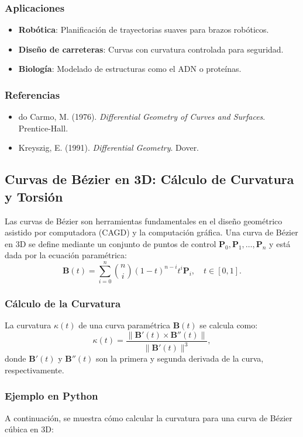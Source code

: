 \documentclass[11pt]{book}
\theoremstyle{definicion}
\theoremstyle{teorema}
\theoremstyle{ejemplo}
\begin{document}
\subsubsection{Aplicaciones}
\begin{itemize}
    \item \textbf{Robótica}: Planificación de trayectorias suaves para brazos robóticos.
    \item \textbf{Diseño de carreteras}: Curvas con curvatura controlada para seguridad.
    \item \textbf{Biología}: Modelado de estructuras como el ADN o proteínas.
\end{itemize}

\subsubsection{Referencias}
\begin{itemize}
    \item do Carmo, M. (1976). \textit{Differential Geometry of Curves and Surfaces}. Prentice-Hall.
    \item Kreyszig, E. (1991). \textit{Differential Geometry}. Dover.
\end{itemize}

\subsection{Curvas de Bézier en 3D: Cálculo de Curvatura y Torsión}

\noindent Las {curvas de Bézier} son herramientas fundamentales en el diseño geométrico asistido por computadora (CAGD) y la computación gráfica. Una curva de Bézier en 3D se define mediante un conjunto de puntos de control \( \mathbf{P}_0, \mathbf{P}_1, \ldots, \mathbf{P}_n \) y está dada por la ecuación paramétrica:
\[
\mathbf{B}(t) = \sum_{i=0}^n \binom{n}{i} (1-t)^{n-i} t^i \mathbf{P}_i, \quad t \in [0,1].
\]

\subsubsection{Cálculo de la Curvatura}
\noindent La {curvatura} \( \kappa(t) \) de una curva paramétrica \( \mathbf{B}(t) \) se calcula como:
\[
\kappa(t) = \frac{\|\mathbf{B}'(t) \times \mathbf{B}''(t)\|}{\|\mathbf{B}'(t)\|^3},
\]
donde \( \mathbf{B}'(t) \) y \( \mathbf{B}''(t) \) son la primera y segunda derivada de la curva, respectivamente.

\subsubsection{Ejemplo en Python}
\noindent A continuación, se muestra cómo calcular la curvatura para una curva de Bézier cúbica en 3D:
\end{document}
